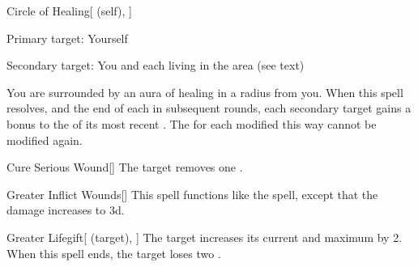 \lowercase{\hypertarget{spell:Circle of Healing}{}}\label{spell:Circle of Healing}
\begin{attuneability}[\nth{4}]{\hypertarget{spell:Circle of Healing}{Circle of Healing}}[ (self), ]

Primary target: Yourself
\par\noindent
Secondary target: You and each living  in the area (see text)

You are surrounded by an aura of healing in a \areamed radius  from you.
When this spell resolves, and the end of each  in subsequent rounds, each secondary target gains a  bonus to the  of its most recent .
The  for each  modified this way cannot be modified again.
\end{attuneability}
\vspace{0.25em}



\lowercase{\hypertarget{spell:Cure Serious Wound}{}}\label{spell:Cure Serious Wound}
\begin{apability}[\nth{4}]{\hypertarget{spell:Cure Serious Wound}{Cure Serious Wound}}[]
The target removes one .
\end{apability}
\vspace{0.25em}



\lowercase{\hypertarget{spell:Greater Inflict Wounds}{}}\label{spell:Greater Inflict Wounds}
\begin{freeability}[\nth{4}]{\hypertarget{spell:Greater Inflict Wounds}{Greater Inflict Wounds}}[]
This spell functions like the  spell, except that the damage increases to  \plus3d.
\end{freeability}
\vspace{0.25em}



\lowercase{\hypertarget{spell:Greater Lifegift}{}}\label{spell:Greater Lifegift}
\begin{attuneability}[\nth{4}]{\hypertarget{spell:Greater Lifegift}{Greater Lifegift}}[ (target), ]
The target increases its current and maximum  by 2.
When this spell ends, the target loses two .
\end{attuneability}
\vspace{0.25em}



